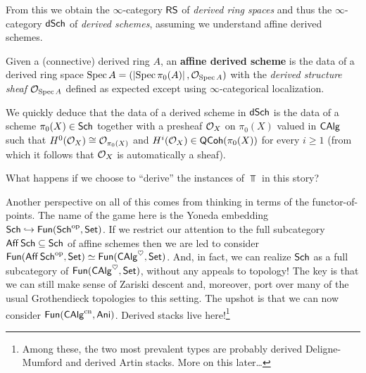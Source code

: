 \documentclass[11pt]{article}
\begin{document}
From this we obtain the $\infty$-category $\operatorname{\mathsf{RS}}$ of \emph{derived ring spaces} and thus the $\infty$-category $\operatorname{\mathsf{dSch}}$ of \emph{derived schemes}, assuming we understand affine derived schemes.

\begin{definition}
Given a (connective) derived ring $A$, an \textbf{affine derived scheme} is the data of a derived ring space $\operatorname{Spec} A=(\left\lvert\operatorname{Spec}\pi_0(A)\right\rvert,\mathcal{O}_{\operatorname{Spec} A})$ with the \emph{derived structure sheaf} $\mathcal{O}_{\operatorname{Spec} A}$ defined as expected except using $\infty$-categorical localization.
\end{definition}

We quickly deduce that the data of a derived scheme in $\operatorname{\mathsf{dSch}}$ is the data of a scheme $\pi_0(X)\in\operatorname{\mathsf{Sch}}$ together with a presheaf $\mathcal{O}_X$ on $\pi_0(X)$ valued in $\operatorname{\mathsf{CAlg}}$ such that $H^0(\mathcal{O}_X)\cong\mathcal{O}_{\pi_0(X)}$ and $H^i(\mathcal{O}_X)\in\operatorname{\mathsf{QCoh}}(\pi_0(X))$ for every $i\geq1$ (from which it follows that $\mathcal{O}_X$ is automatically a sheaf).

\begin{question}
What happens if we choose to ``derive'' the instances of $\Top$ in this story?
\end{question}

Another perspective on all of this comes from thinking in terms of the functor-of-points. The name of the game here is the Yoneda embedding $\operatorname{\mathsf{Sch}}\hookrightarrow\operatorname{\mathsf{Fun}}(\operatorname{\mathsf{Sch}}^{\operatorname{op}},\operatorname{\mathsf{Set}})$. If we restrict our attention to the full subcategory $\operatorname{\mathsf{Aff}}\operatorname{\mathsf{Sch}}\subseteq\operatorname{\mathsf{Sch}}$ of affine schemes then we are led to consider $\operatorname{\mathsf{Fun}}(\operatorname{\mathsf{Aff}}\operatorname{\mathsf{Sch}}^{\operatorname{op}},\operatorname{\mathsf{Set}})\simeq\operatorname{\mathsf{Fun}}(\operatorname{\mathsf{CAlg}}^{\heartsuit},\operatorname{\mathsf{Set}})$. And, in fact, we can realize $\operatorname{\mathsf{Sch}}$ as a full subcategory of $\operatorname{\mathsf{Fun}}(\operatorname{\mathsf{CAlg}}^{\heartsuit},\operatorname{\mathsf{Set}})$, without any appeals to topology! The key is that we can still make sense of Zariski descent and, moreover, port over many of the usual Grothendieck topologies to this setting. The upshot is that we can now consider $\operatorname{\mathsf{Fun}}(\operatorname{\mathsf{CAlg}}^{\operatorname{cn}},\operatorname{\mathsf{Ani}})$. Derived stacks live here!\footnote{Among these, the two most prevalent types are probably derived Deligne-Mumford and derived Artin stacks. More on this later\ldots}
\end{document}
